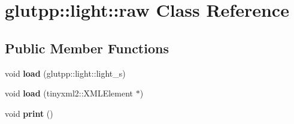 \hypertarget{classglutpp_1_1light_1_1raw}{\section{glutpp\-:\-:light\-:\-:raw \-Class \-Reference}
\label{classglutpp_1_1light_1_1raw}
}
\subsection*{\-Public \-Member \-Functions}
\begin{DoxyCompactItemize}
\item 
\hypertarget{classglutpp_1_1light_1_1raw_a6162f0f546b1b04b07757456dd5649b0}{void {\bfseries load} (glutpp\-::light\-::light\-\_\-s)}\label{classglutpp_1_1light_1_1raw_a6162f0f546b1b04b07757456dd5649b0}

\item 
\hypertarget{classglutpp_1_1light_1_1raw_a18d0e77687236ebb13ffd48872c35a3c}{void {\bfseries load} (tinyxml2\-::\-X\-M\-L\-Element $\ast$)}\label{classglutpp_1_1light_1_1raw_a18d0e77687236ebb13ffd48872c35a3c}

\item 
\hypertarget{classglutpp_1_1light_1_1raw_a9818fe2fc9498110fa26b408a15df2e7}{void {\bfseries print} ()}\label{classglutpp_1_1light_1_1raw_a9818fe2fc9498110fa26b408a15df2e7}

\end{DoxyCompactItemize}
